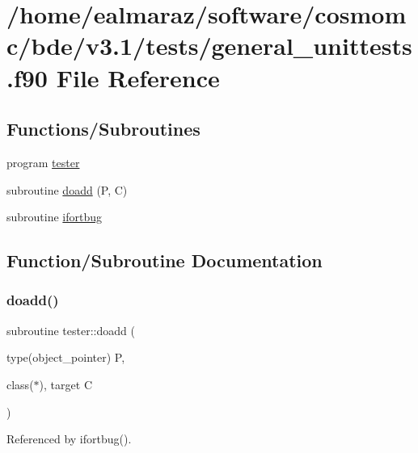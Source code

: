 \hypertarget{general__unittests_8f90}{}\section{/home/ealmaraz/software/cosmomc/bde/v3.1/tests/general\+\_\+unittests.f90 File Reference}
\label{general__unittests_8f90}
\subsection*{Functions/\+Subroutines}
\begin{DoxyCompactItemize}
\item 
program \mbox{\hyperlink{general__unittests_8f90_abb1af5b22eb90cec23fca42accb63245}{tester}}
\item 
subroutine \mbox{\hyperlink{general__unittests_8f90_a5fbc3ab2a5412f1158793fbf4cdceff0}{doadd}} (P, C)
\item 
subroutine \mbox{\hyperlink{general__unittests_8f90_a0d741a25cd31d879b5d33dd390fc241c}{ifortbug}}
\end{DoxyCompactItemize}


\subsection{Function/\+Subroutine Documentation}
\mbox{\label{general__unittests_8f90_a5fbc3ab2a5412f1158793fbf4cdceff0}} 
\subsubsection{\texorpdfstring{doadd()}{doadd()}}
{\footnotesize\ttfamily subroutine tester\+::doadd (\begin{DoxyParamCaption}\item[{type(object\+\_\+pointer)}]{P,  }\item[{class($\ast$), target}]{C }\end{DoxyParamCaption})}



Referenced by ifortbug().

